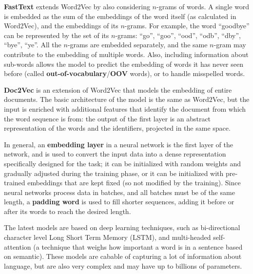 \textbf{FastText} extends Word2Vec by also considering $n$-grams of words. A single word is embedded as the sum of the embeddings of the word itself (as calculated in Word2Vec), and the embeddings of its $n$-grams. For example, the word ``goodbye'' can be represented by the set of its $n$-grams: ``go'', ``goo'', ``ood'', ``odb'', ``dby'', ``bye'', ``ye''. All the $n$-grams are embedded separately, and the same $n$-gram may contribute to the embedding of multiple words. Also, including information about sub-words allows the model to predict the embedding of words it has never seen before (called \textbf{out-of-vocabulary}/\textbf{OOV} words), or to handle misspelled words.

\textbf{Doc2Vec} is an extension of Word2Vec that models the embedding of entire documents. The basic architecture of the model is the same as Word2Vec, but the input is enriched with additional features that identify the document from which the word sequence is from: the output of the first layer is an abstract representation of the words and the identifiers, projected in the same space.

In general, an \textbf{embedding layer} in a neural network is the first layer of the network, and is used to convert the input data into a dense representation specifically designed for the task; it can be initialized with random weights and gradually adjusted during the training phase, or it can be initialized with pre-trained embeddings that are kept fixed (so not modified by the training). Since neural networks process data in batches, and all batches must be of the same length, a \textbf{padding word} is used to fill shorter sequences, adding it before or after its words to reach the desired length.

The latest models are based on deep learning techniques, such as bi-directional character level Long Short Term Memory (LSTM), and multi-headed self-attention (a technique that weighs how important a word is in a sentence based on semantic). These models are cabable of capturing a lot of information about language, but are also very complex and may have up to billions of parameters.